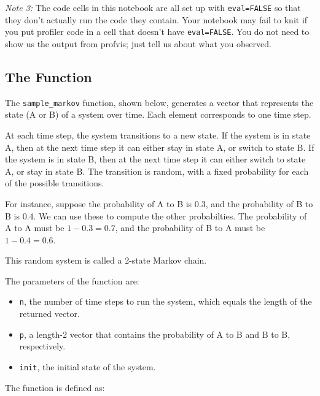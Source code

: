 \documentclass[
]{article}
\providecommand{\tightlist}{%
  \setlength{\itemsep}{0pt}\setlength{\parskip}{0pt}}
\begin{document}
\emph{Note 3:} The code cells in this notebook are all set up with
\texttt{eval=FALSE} so that they don't actually run the code they
contain. Your notebook may fail to knit if you put profiler code in a
cell that doesn't have \texttt{eval=FALSE}. You do not need to show us
the output from profvis; just tell us about what you observed.

\hypertarget{the-function}{%
\subsection{The Function}\label{the-function}}

The \texttt{sample\_markov} function, shown below, generates a vector
that represents the state (A or B) of a system over time. Each element
corresponds to one time step.

At each time step, the system transitions to a new state. If the system
is in state A, then at the next time step it can either stay in state A,
or switch to state B. If the system is in state B, then at the next time
step it can either switch to state A, or stay in state B. The transition
is random, with a fixed probability for each of the possible
transitions.

For instance, suppose the probability of A to B is 0.3, and the
probability of B to B is 0.4. We can use these to compute the other
probabilties. The probability of A to A must be \(1 - 0.3 = 0.7\), and
the probability of B to A must be \(1 - 0.4 = 0.6\).

This random system is called a 2-state Markov chain.

The parameters of the function are:

\begin{itemize}
\tightlist
\item
  \texttt{n}, the number of time steps to run the system, which equals
  the length of the returned vector.
\item
  \texttt{p}, a length-2 vector that contains the probability of A to B
  and B to B, respectively.
\item
  \texttt{init}, the initial state of the system.
\end{itemize}

The function is defined as:
\end{document}
